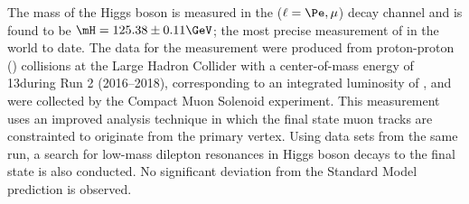 % 
The mass of the Higgs boson is measured in the \hzzfourl
($\ell = \Pe, \mu$) %
decay channel and is found to be $\mH = 125.38 \pm 0.11\GeV$;
the most precise measurement of \mH in the world to date. 
The data for the measurement were produced from proton-proton (\pp) collisions at the Large Hadron Collider with a center-of-mass energy of 13\TeV during Run 2 (2016--2018), corresponding to an integrated luminosity of \lumiruntwo, and were collected by the Compact Muon Solenoid experiment.
This measurement uses an improved analysis technique in which the final state muon tracks are constrainted to originate from the primary \pp vertex.
Using data sets from the same run, a search for low-mass dilepton resonances in Higgs boson decays to the \fourl final state is also conducted.
No significant deviation from the Standard Model prediction is observed.

